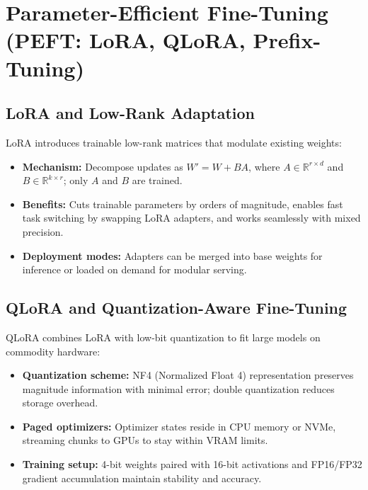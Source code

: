 \documentclass{article}
\begin{document}
\section{Parameter-Efficient Fine-Tuning (PEFT: LoRA, QLoRA, Prefix-Tuning)}
\subsection{LoRA and Low-Rank Adaptation}
LoRA introduces trainable low-rank matrices that modulate existing weights:
\begin{itemize}
  \item \textbf{Mechanism:} Decompose updates as $W' = W + B A$, where $A \in \mathbb{R}^{r \times d}$ and $B \in \mathbb{R}^{k \times r}$; only $A$ and $B$ are trained.
  \item \textbf{Benefits:} Cuts trainable parameters by orders of magnitude, enables fast task switching by swapping LoRA adapters, and works seamlessly with mixed precision.
  \item \textbf{Deployment modes:} Adapters can be merged into base weights for inference or loaded on demand for modular serving.
\end{itemize}

\subsection{QLoRA and Quantization-Aware Fine-Tuning}
QLoRA combines LoRA with low-bit quantization to fit large models on commodity hardware:
\begin{itemize}
  \item \textbf{Quantization scheme:} NF4 (Normalized Float 4) representation preserves magnitude information with minimal error; double quantization reduces storage overhead.
  \item \textbf{Paged optimizers:} Optimizer states reside in CPU memory or NVMe, streaming chunks to GPUs to stay within VRAM limits.
  \item \textbf{Training setup:} 4-bit weights paired with 16-bit activations and FP16/FP32 gradient accumulation maintain stability and accuracy.
\end{itemize}
\end{document}
